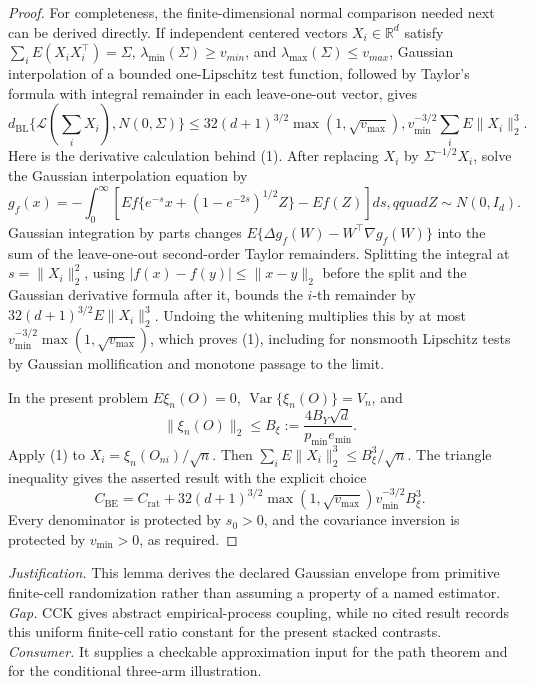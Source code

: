 \documentclass{article}
\begin{document}
\begin{proof}
For completeness, the finite-dimensional normal comparison needed next can be derived directly.  If independent centered vectors \(X_i\in\mathbb R^d\) satisfy \(\sum_iE(X_iX_i^\top)=\Sigma\), \(\lambda_{\min}(\Sigma)\ge v_{min}\), and \(\lambda_{\max}(\Sigma)\le v_{max}\), Gaussian interpolation of a bounded one-Lipschitz test function, followed by Taylor's formula with integral remainder in each leave-one-out vector, gives
\[
 d_{\mathrm{BL}}\{\mathcal L(\textstyle\sum_iX_i),N(0,\Sigma)\}
 \le 32(d+1)^{3/2}\max(1,\sqrt{v_{\max}}),v_{\min}^{-3/2}
       \sum_iE\|X_i\|_2^3.                                           \tag{1}
\]
Here is the derivative calculation behind (1).  After replacing \(X_i\) by \(\Sigma^{-1/2}X_i\), solve the Gaussian interpolation equation by
\[
 g_f(x)=-\int_0^\infty
 \left[E f\{e^{-s}x+(1-e^{-2s})^{1/2}Z\}-Ef(Z)\right]ds,qquad Z\sim N(0,I_d).
\]
Gaussian integration by parts changes \(E\{\Delta g_f(W)-W^\top\nabla g_f(W)\}\) into the sum of the leave-one-out second-order Taylor remainders.  Splitting the integral at \(s=\|X_i\|_2^2\), using \(|f(x)-f(y)|\le\|x-y\|_2\) before the split and the Gaussian derivative formula after it, bounds the \(i\)-th remainder by \(32(d+1)^{3/2}E\|X_i\|_2^3\).  Undoing the whitening multiplies this by at most \(v_{\min}^{-3/2}\max(1,\sqrt{v_{\max}})\), which proves (1), including for nonsmooth Lipschitz tests by Gaussian mollification and monotone passage to the limit.

In the present problem \(E\xi_n(O)=0\), \(\operatorname{Var}\{\xi_n(O)\}=V_n\), and
\[
 \|\xi_n(O)\|_2\le B_\xi:=\frac{4B_Y\sqrt d}{p_{\min}e_{\min}}.
\]
Apply (1) to \(X_i=\xi_n(O_{ni})/\sqrt n\).  Then \(\sum_iE\|X_i\|_2^3\le B_\xi^3/\sqrt n\).  The triangle inequality gives the asserted result with the explicit choice
\[
 C_{\mathrm{BE}}=C_{\mathrm{rat}}+
 32(d+1)^{3/2}\max(1,\sqrt{v_{\max}})v_{\min}^{-3/2}B_\xi^3.
\]
Every denominator is protected by \(s_0>0\), and the covariance inversion is protected by \(v_{\min}>0\), as required.
\end{proof}
\par\smallskip\noindent \textit{Justification.} This lemma derives the declared Gaussian envelope from primitive finite-cell randomization rather than assuming a property of a named estimator. \textit{Gap.} CCK gives abstract empirical-process coupling, while no cited result records this uniform finite-cell ratio constant for the present stacked contrasts. \textit{Consumer.} It supplies a checkable approximation input for the path theorem and for the conditional three-arm illustration.
\end{document}
